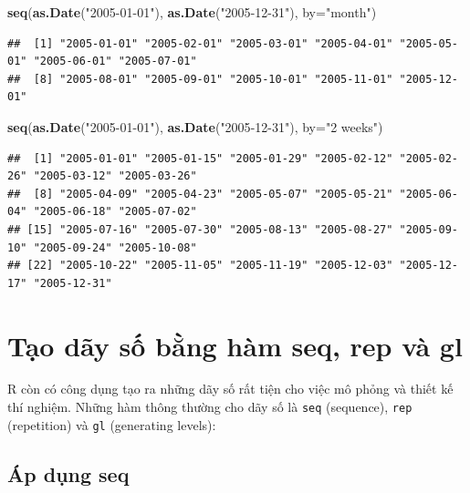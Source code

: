 \documentclass[
]{book}
\newenvironment{Shaded}{\begin{snugshade}}{\end{snugshade}}
\newcommand{\DataTypeTok}[1]{\textcolor[rgb]{0.13,0.29,0.53}{#1}}
\newcommand{\KeywordTok}[1]{\textcolor[rgb]{0.13,0.29,0.53}{\textbf{#1}}}
\newcommand{\NormalTok}[1]{#1}
\newcommand{\StringTok}[1]{\textcolor[rgb]{0.31,0.60,0.02}{#1}}
\begin{document}
\begin{Shaded}
\begin{Highlighting}[]
\KeywordTok{seq}\NormalTok{(}\KeywordTok{as.Date}\NormalTok{(}\StringTok{"2005{-}01{-}01"}\NormalTok{), }\KeywordTok{as.Date}\NormalTok{(}\StringTok{"2005{-}12{-}31"}\NormalTok{), }\DataTypeTok{by=}\StringTok{"month"}\NormalTok{)}
\end{Highlighting}
\end{Shaded}

\begin{verbatim}
##  [1] "2005-01-01" "2005-02-01" "2005-03-01" "2005-04-01" "2005-05-01" "2005-06-01" "2005-07-01"
##  [8] "2005-08-01" "2005-09-01" "2005-10-01" "2005-11-01" "2005-12-01"
\end{verbatim}

\begin{Shaded}
\begin{Highlighting}[]
\KeywordTok{seq}\NormalTok{(}\KeywordTok{as.Date}\NormalTok{(}\StringTok{"2005{-}01{-}01"}\NormalTok{), }\KeywordTok{as.Date}\NormalTok{(}\StringTok{"2005{-}12{-}31"}\NormalTok{), }\DataTypeTok{by=}\StringTok{"2 weeks"}\NormalTok{)}
\end{Highlighting}
\end{Shaded}

\begin{verbatim}
##  [1] "2005-01-01" "2005-01-15" "2005-01-29" "2005-02-12" "2005-02-26" "2005-03-12" "2005-03-26"
##  [8] "2005-04-09" "2005-04-23" "2005-05-07" "2005-05-21" "2005-06-04" "2005-06-18" "2005-07-02"
## [15] "2005-07-16" "2005-07-30" "2005-08-13" "2005-08-27" "2005-09-10" "2005-09-24" "2005-10-08"
## [22] "2005-10-22" "2005-11-05" "2005-11-19" "2005-12-03" "2005-12-17" "2005-12-31"
\end{verbatim}

\hypertarget{tux1ea1o-duxe3y-sux1ed1-bux1eb1ng-huxe0m-seq-rep-vuxe0-gl}{%
\section{Tạo dãy số bằng hàm seq, rep và gl}\label{tux1ea1o-duxe3y-sux1ed1-bux1eb1ng-huxe0m-seq-rep-vuxe0-gl}}

R còn có công dụng tạo ra những dãy số rất tiện cho việc mô phỏng và thiết kế thí nghiệm. Những hàm thông thường cho dãy số là \texttt{seq} (sequence), \texttt{rep} (repetition) và \texttt{gl} (generating levels):

\hypertarget{uxe1p-dux1ee5ng-seq}{%
\subsection*{Áp dụng seq}\label{uxe1p-dux1ee5ng-seq}}
\end{document}
